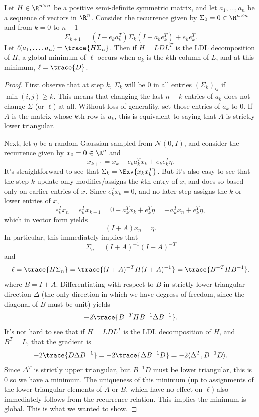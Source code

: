 \begin{toappendix}    
\begin{lemma}
\label{lemmaSigmaRecurrence}
Let $H \in \R^{n \times n}$ be a positive semi-definite symmetric matrix, and let $a_1,\ldots,a_n$ be a sequence of vectors in $\R^n$. Consider the recurrence given by $\Sigma_0 = 0 \in \R^{n \times n}$ and from $k=0$ to $n-1$
\[
    \Sigma_{k+1} = (I - e_k a_k^T) \Sigma_k (I - a_k e_k^T) + e_k e_k^T.
\]
Let $\ell(a_1,\ldots,a_n) = \trace{H \Sigma_n}$.
Then if $H = L D L^T$ is the LDL decomposition of $H$, a global minimum of $\ell$ occurs when $a_k$ is the $k$th column of $L$, and at this minimum, $\ell = \trace{D}$.
\end{lemma}
\begin{proof}
First observe that at step $k$, $\Sigma_k$ will be $0$ in all entries $(\Sigma_k)_{ij}$ if $\min(i,j) \ge k$. This means that changing the last $n-k$ entries of $a_k$ does not change $\Sigma$ (or $\ell$) at all. Without loss of generality, set those entries of $a_k$ to $0$. If $A$ is the matrix whose $k$th row is $a_k$, this is equivalent to saying that $A$ is strictly lower triangular.

Next, let $\eta$ be a random Gaussian sampled from $\mathcal{N}(0, I)$, and consider the recurrence given by $x_0 = 0 \in \R^n$ and
\[
    x_{k+1} = x_k - e_k a_k^T x_k + e_k e_k^T \eta.
\]
It's straightforward to see that $\Sigma_k = \Exv{ x_k x_k^T }$. But it's also easy to see that the step-$k$ update only modifies/assigns the $k$th entry of $x$, and does so based only on earlier entries of $x$. Since $e_k^T x_k = 0$, and no later step assigns the $k$-or-lower entries of $x$,
\[
    e_k^T x_n = e_k^T x_{k+1} = 0 - a_k^T x_k + e_k^T \eta = - a_k^T x_n + e_k^T \eta,
\]
which in vector form yields
\[
    (I + A) x_n = \eta.
\]
In particular, this immediately implies that
\[
    \Sigma_n = (I + A)^{-1} (I + A)^{-T}
\]
and
\[
    \ell = \trace{H \Sigma_n} = \trace{ (I + A)^{-T} H (I + A)^{-1} } = \trace{ B^{-T} H B^{-1} }.
\]
where $B = I+A$.
Differentiating with respect to $B$ in strictly lower triangular direction $\Delta$ (the only direction in which we have degress of freedom, since the diagonal of $B$ must be unit) yields %
\[
   -2 \trace{ B^{-T} H B^{-1} \Delta B^{-1} }.
\]
It's not hard to see that if $H = L D L^T$ is the LDL decomposition of $H$, and $B^T = L$, that the gradient is
\[
   -2 \trace{ D \Delta B^{-1} }
   =
   -2 \trace{ \Delta B^{-1} D }
   =
   -2 \langle \Delta^T, B^{-1} D \rangle.
\]
Since $\Delta^T$ is strictly upper triangular, but $B^{-1} D$ must be lower triangular, this is $0$ so we have a minimum. The uniqueness of this minimum (up to assignments of the lower-triangular elements of $A$ or $B$, which have no effect on $\ell$) also immediately follows from the recurrence relation. This implies the minimum is global. This is what we wanted to show.
\end{proof}
\end{toappendix}


